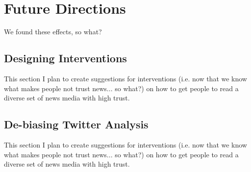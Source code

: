 \chapter{Future Directions}
We found these effects, so what?
 
\section{Designing Interventions}
This section I plan to create suggestions for interventions (i.e. now that we know what makes people not trust news... so what?) on how to get people to read a diverse set of news media with high trust.


\section{De-biasing Twitter Analysis}
This section I plan to create suggestions for interventions (i.e. now that we know what makes people not trust news... so what?) on how to get people to read a diverse set of news media with high trust.
